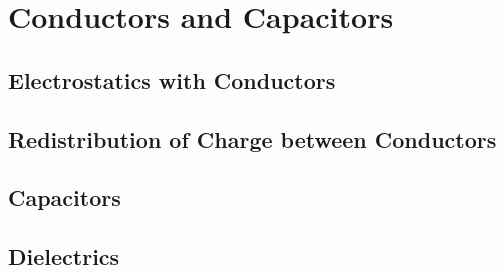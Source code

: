 \documentclass[../em.tex]{subfiles}
\begin{document}
\chapter{Conductors and Capacitors}
\section{Electrostatics with Conductors}
\section{Redistribution of Charge between Conductors}
\section{Capacitors}
\section{Dielectrics}
\end{document}
